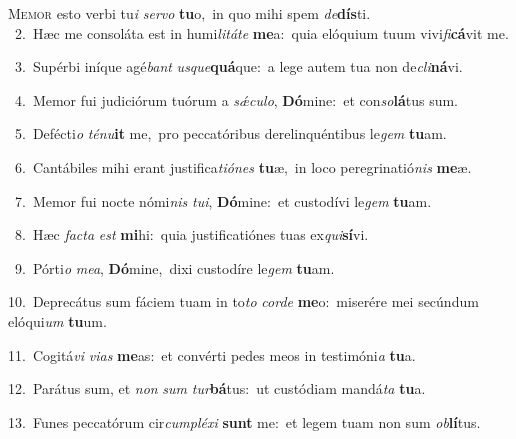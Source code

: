 \lettrine{\initial\textcolor{\initialcolor}{M}}{emor} esto verbi tu\textit{i} \textit{ser}\-\textit{vo} \textbf{tu}\-o,~\star in quo mihi spem \textit{de}\-\textbf{dís}ti.\\
{\numbfont\textcolor{\numbcolor}{~2.}}~Hæc me consoláta est in humi\-\textit{li}\-\textit{tá}\textit{te} \textbf{me}\-a:~\star quia elóquium tuum vivi\-\textit{fi}\-\textbf{cá}vit me.\par
{\numbfont\textcolor{\numbcolor}{~3.}}~Supérbi iníque agé\textit{bant} \textit{us}\-\textit{que}\textbf{quá}que:~\star a lege autem tua non de\-\textit{cli}\-\textbf{ná}vi.\par
{\numbfont\textcolor{\numbcolor}{~4.}}~Memor fui judiciórum tuórum a \textit{sǽ}\-\textit{cu}\textit{lo}, \textbf{Dó}\-mine:~\star et con\-\textit{so}\-\textbf{lá}tus sum.\par
{\numbfont\textcolor{\numbcolor}{~5.}}~Defécti\textit{o} \textit{té}\-\textit{nu}\textbf{it} me,~\star pro peccatóribus derelinquéntibus le\textit{gem} \textbf{tu}\-am.\par
{\numbfont\textcolor{\numbcolor}{~6.}}~Cantábiles mihi erant justifica\-\textit{ti}\-\textit{ó}\textit{nes} \textbf{tu}\-æ,~\star in loco peregrinatió\textit{nis} \textbf{me}\-æ.\par
{\numbfont\textcolor{\numbcolor}{~7.}}~Memor fui nocte nómi\textit{nis} \textit{tu}\-\textit{i}, \textbf{Dó}\-mine:~\star et custodívi le\textit{gem} \textbf{tu}\-am.\par
{\numbfont\textcolor{\numbcolor}{~8.}}~Hæc \textit{fac}\-\textit{ta} \textit{est} \textbf{mi}\-hi:~\star quia justificatiónes tuas ex\-\textit{qui}\-\textbf{sí}vi.\par
{\numbfont\textcolor{\numbcolor}{~9.}}~Pórti\textit{o} \textit{me}\-\textit{a}, \textbf{Dó}\-mine,~\star dixi custodíre le\textit{gem} \textbf{tu}\-am.\par
{\numbfont\textcolor{\numbcolor}{10.}}~Deprecátus sum fáciem tuam in to\textit{to} \textit{cor}\-\textit{de} \textbf{me}\-o:~\star miserére mei secúndum elóqui\textit{um} \textbf{tu}\-um.\par
{\numbfont\textcolor{\numbcolor}{11.}}~Cogitá\textit{vi} \textit{vi}\-\textit{as} \textbf{me}\-as:~\star et convérti pedes meos in testimóni\textit{a} \textbf{tu}\-a.\par
{\numbfont\textcolor{\numbcolor}{12.}}~Parátus sum, et \textit{non} \textit{sum} \textit{tur}\-\textbf{bá}tus:~\star ut custódiam mandá\textit{ta} \textbf{tu}\-a.\par
{\numbfont\textcolor{\numbcolor}{13.}}~Funes peccatórum cir\-\textit{cum}\-\textit{plé}\textit{xi} \textbf{sunt} me:~\star et legem tuam non sum \textit{ob}\-\textbf{lí}tus.\par
